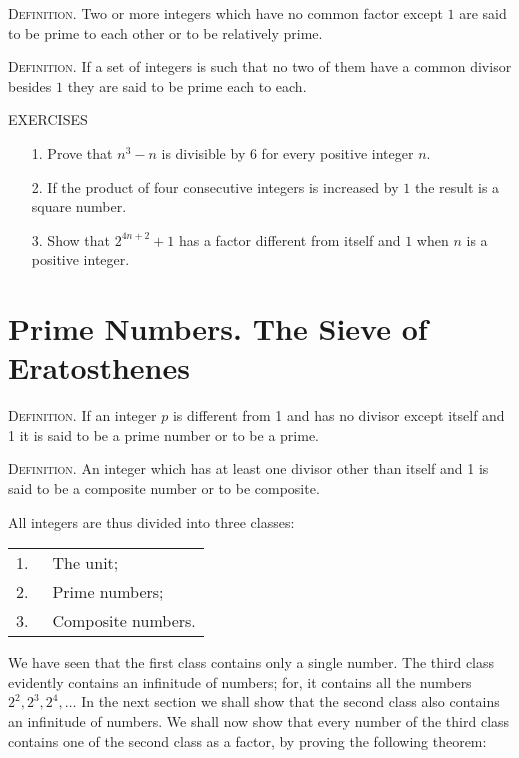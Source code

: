 \documentclass[oneside]{book}
\begin{document}
\smallskip \textsc{Definition.} Two or more integers which have no
common factor except $1$ are said to be prime to each other or to be
relatively prime.

\smallskip \textsc{Definition.} If a set of integers is such that no
two of them have a common divisor besides $1$ they are said to be
prime each to each.

\begin{center}
EXERCISES
\end{center}

\small \begin{enumerate}
\item[1.] Prove that $n^3 - n$ is divisible by $6$ for every
positive integer $n$.

\item[2.] If the product of four consecutive integers is increased by
$1$ the result is a square number.

\item[3.] Show that $2^{4n + 2} + 1$ has a factor different from itself
and $1$ when $n$ is a positive integer.
\end{enumerate} \normalsize

\section{Prime Numbers. The Sieve of Eratosthenes}\label{s3}%

\textsc{Definition.} If an integer $p$ is different from 1 and has
no divisor except itself and 1 it is said to be a prime number or to
be a prime.

\smallskip \textsc{Definition.} An integer which has at least one
divisor other than itself and 1 is said to be a composite number or
to be composite.

All integers are thus divided into three classes:
\begin{table}[h]
\begin{tabular}{rl}
1.\ & The unit; \\
2.\ & Prime numbers; \\
3.\ & Composite numbers.
\end{tabular}
\end{table}

We have seen that the first class contains only a single number. The
third class evidently contains an infinitude of numbers; for, it
contains all the numbers $2^2, 2^3, 2^4, \ldots$ In the next section
we shall show that the second class also contains an infinitude of
numbers. We shall now show that every number of the third class
contains one of the second class as a factor, by proving the
following theorem:
\end{document}
